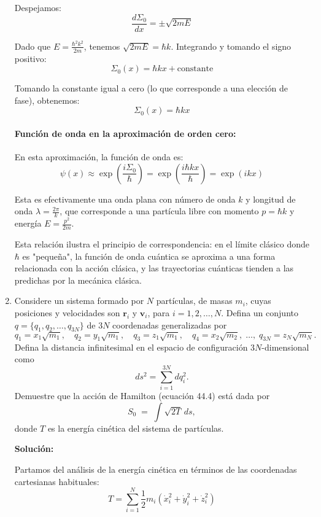 \documentclass[12pt]{article}
\begin{document}
\begin{enumerate}
  Despejamos:
  \[
    \frac{d\Sigma_0}{dx} = \pm\sqrt{2mE}
  \]

  Dado que $E = \frac{\hbar^2k^2}{2m}$, tenemos $\sqrt{2mE} = \hbar k$. Integrando y tomando el signo positivo:
  \[
    \Sigma_0(x) = \hbar kx + \text{constante}
  \]

  Tomando la constante igual a cero (lo que corresponde a una elección de fase), obtenemos:
  \[
    \Sigma_0(x) = \hbar kx
  \]

  \paragraph{Función de onda en la aproximación de orden cero:}

  En esta aproximación, la función de onda es:
  \[
    \psi(x) \approx \exp\left(\frac{i\Sigma_0}{\hbar}\right) = \exp\left(\frac{i\hbar kx}{\hbar}\right) = \exp(ikx)
  \]

  Esta es efectivamente una onda plana con número de onda $k$ y longitud de onda $\lambda = \frac{2\pi}{k}$, que corresponde a una partícula libre con momento $p = \hbar k$ y energía $E = \frac{p^2}{2m}$.

  Esta relación ilustra el principio de correspondencia: en el límite clásico donde $\hbar$ es "pequeña", la función de onda cuántica se aproxima a una forma relacionada con la acción clásica, y las trayectorias cuánticas tienden a las predichas por la mecánica clásica.

  \item Considere un sistema formado por \(N\) partículas, de masas \(m_i\), cuyas posiciones y velocidades son \(\mathbf{r}_i\) y \(\mathbf{v}_i\), para \(i=1,2,\dots,N\). Defina un conjunto \(q=\{q_1,q_2,\dots,q_{3N}\}\) de \(3N\) coordenadas generalizadas por
    \[
      q_1 = x_1\sqrt{m_1},\quad
      q_2 = y_1\sqrt{m_1},\quad
      q_3 = z_1\sqrt{m_1},\quad
      q_4 = x_2\sqrt{m_2},\;\dots,\;
      q_{3N} = z_N\sqrt{m_N}.
    \]
    Defina la distancia infinitesimal en el espacio de configuración \(3N\)-dimensional como
    \[
      ds^2 = \sum_{i=1}^{3N} dq_i^2.
    \]
    Demuestre que la acción de Hamilton (ecuación 44.4) está dada por
    \[
      S_0 \;=\; \int \sqrt{2T}\,ds,
    \]
    donde \(T\) es la energía cinética del sistema de partículas.

  \textbf{Solución:}

  Partamos del análisis de la energía cinética en términos de las coordenadas cartesianas habituales:
  \[
  T = \sum_{i=1}^N \frac{1}{2}m_i(\dot{x}_i^2 + \dot{y}_i^2 + \dot{z}_i^2)
  \]


\end{enumerate}
\end{document}

